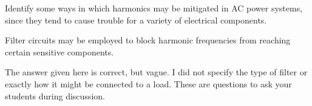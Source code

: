 

Identify some ways in which harmonics may be mitigated in AC power systems, since they tend to cause trouble for a variety of electrical components.







Filter circuits may be employed to block harmonic frequencies from reaching certain sensitive components.







The answer given here is correct, but vague.  I did not specify the type of filter or exactly how it might be connected to a load.  These are questions to ask your students during discussion.




